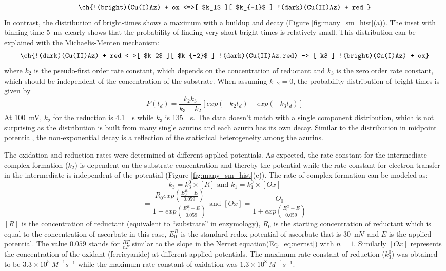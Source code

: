 \begin{align}
	\ch{!(bright)(Cu(I)Az) + ox <=>[ $k_1$ ][ $k_{-1}$ ] !(dark)(Cu(II)Az) + red }
	\label{eq:oxidation}
\end{align}
In contrast, the distribution of bright-times shows a maximum with a buildup and decay (Figure \ref{fig:many_sm_hist}(a)).
The inset with binning time \SI{5}{\ms} clearly shows that the probability of finding very short bright-times is relatively small.
This distribution can be explained with the Michaelis-Menten mechanism:
\begin{align}
	\ch{!(dark)(Cu(II)Az) + red <=>[ $k_2$ ][ $k_{-2}$ ] !(dark)(Cu(II)Az.red) -> [ k3 ] !(bright)(Cu(I)Az) + ox}
	\label{eq:reduction}
\end{align}
where $k_2$ is the pseudo-first order rate constant, which depends on the concentration of reductant and $k_3$ is the zero order rate constant, which should be independent of the concentration of the substrate.
When assuming $k_{-2}=0$, the probability distribution of bright times is given by\cite{lu1998single-molecule}
\begin{equation}
	P(t_{d}) = \frac{k_2k_3}{k_3-k_2} [exp(-k_2t_{d})-exp(-k_3t_{d})]
	\label{eq:2exp_risetime}
\end{equation}
At \SI{100}{\mV}, $k_2$ for the reduction is \SI{4.1}{\per\s} while $k_3$ is \SI{135}{\per\s}.
The data doesn't match with a single component distribution, which is not surprising as the distribution is built from many single azurins and each azurin has its own decay.
Similar to the distribution in midpoint potential, the non-exponential decay is a reflection of the statistical heterogeneity among the azurins.

The oxidation and reduction rates were determined at different applied potentials.
As expected, the rate constant for the intermediate complex formation ($k_2$) is dependent on the substrate concentration and thereby the potential while the rate constant for electron transfer in the intermediate is independent of the potential (Figure \ref{fig:many_sm_hist}(c)).
The rate of complex formation can be modeled as:
\begin{equation}
	k_3 =k_3^0\times[R] \text{ and } k_1 =k_1^0\times[Ox]
	\label{eq:rate_complex}
\end{equation}
\begin{equation}
	[R] = \frac{R_0exp(\frac{E_0^R-E}{0.059})}{1+exp(\frac{E_0^R-E}{0.059})}
	\text{ and } [Ox] = \frac{O_0}{1+exp(\frac{E_0^O-E}{0.059})}
	\label{eq:conc_potential}
\end{equation}
$[R]$ is the concentration of reductant (equivalent to ``substrate'' in enzymology), $R_0$ is the starting concentration of reductant which is equal to the concentration of ascorbate in this case, $E_0^R$ is the standard redox potential of ascorbate that is \SI{30}{\mV} and $E$ is the applied potential. The value $0.059$ stands for $\frac{RT}{nF}$ similar to the slope in the Nernst equation(Eq. \ref{eq:nernst}) with $n=1$.
Similarly $[Ox]$ represents the concentration of the oxidant (ferricyanide) at different applied potentials.
The maximum rate constant of reduction ($k_3^0$) was obtained to be $3.3\times10^5~M^{-1}s^{-1}$ while the maximum rate constant of oxidation was $1.3\times10^8~M^{-1}s^{-1}$.

